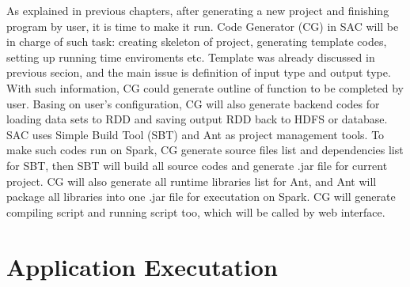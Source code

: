 As explained in previous chapters, after generating a new project and finishing program by user, it is time to make it run. Code Generator (CG) in SAC will be in charge of such task: creating skeleton of project, generating template codes, setting up running time enviroments etc. Template was already discussed in previous secion, and the main issue is definition of input type and output type. With such information, CG could generate outline of function to be completed by user. Basing on user's configuration, CG will also generate backend codes for loading data sets to RDD and saving output RDD back to HDFS or database. SAC uses Simple Build Tool (SBT) \cite{ScalaSBT} and Ant \cite{ApacheAnt} as project management tools. To make such codes run on Spark, CG generate source files list and dependencies list for SBT, then SBT will build all source codes and generate .jar file for current project. CG will also generate all runtime libraries list for Ant, and Ant will package all libraries into one .jar file for executation on Spark. CG will generate compiling script and running script too, which will be called by web interface.


\section{Application Executation}


